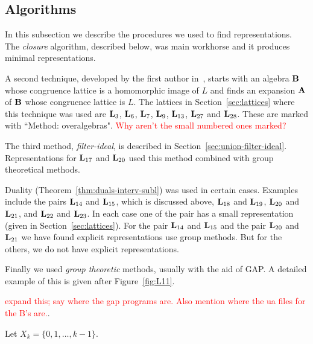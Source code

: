 {%

\subsection{Algorithms}
In this subsection we describe the procedures we used to 
find representations. The \emph{closure} algorithm, described below,
was main workhorse and it produces minimal representations. 

A second technique, developed by the first author in~\cite{DeMeo2013},
starts with an algebra $\mathbf{B}$ whose congruence lattice is
a homomorphic image of $L$ and finds an expansion $\mathbf{A}$ of $\mathbf{B}$
whose congruence lattice is $L$.
The lattices in Section~\ref{sec:lattices} where this 
technique was used are 
$\mathbf{L}_3$, $\mathbf{L}_6$, $\mathbf{L}_7$, $\mathbf{L}_9$,
$\mathbf{L}_{13}$, $\mathbf{L}_{27}$ and $\mathbf{L}_{28}$. These are marked with 
``Method: overalgebras". \textcolor{red}{Why aren't the small
numbered ones marked?}


The third method, \emph{filter-ideal}, is described in 
Section~\ref{sec:union-filter-ideal}. Representations 
for $\mathbf{L}_{17}$ and $\mathbf{L}_{20}$ used this method combined
with group theoretical methods.


Duality (Theorem~\ref{thm:duals-interv-subl}) was used in 
certain cases. Examples include the pairs 
$\mathbf{L}_{14}$ and $\mathbf{L}_{15}$, which is discussed above,
$\mathbf{L}_{18}$ and $\mathbf{L}_{19}$,
$\mathbf{L}_{20}$ and $\mathbf{L}_{21}$, and
$\mathbf{L}_{22}$ and $\mathbf{L}_{23}$.
In each case one of the pair has a small representation (given
in Section~\ref{sec:lattices}). For the pair
$\mathbf{L}_{14}$ and $\mathbf{L}_{15}$ and the pair 
$\mathbf{L}_{20}$ and $\mathbf{L}_{21}$ we have found explicit representations
use group methods. But for the others, we do not have 
explicit representations.


Finally we used \emph{group theoretic} methods, usually with the aid
of GAP. A detailed example of this is given after Figure~\ref{fig:L11}.


\textcolor{red}{expand this; say where the gap programs are.
Also mention where the ua files for the B's are.}. 


Let $X_k = \{0, 1, \ldots, k-1\}$.


}
